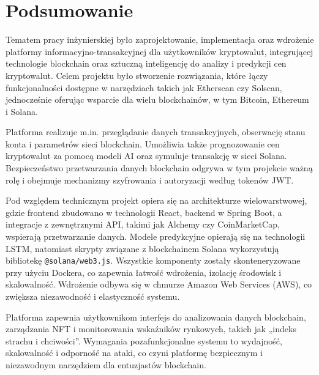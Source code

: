 \chapter{Podsumowanie}
Tematem pracy inżynierskiej było zaprojektowanie, implementacja oraz wdrożenie platformy informacyjno-transakcyjnej dla użytkowników kryptowalut, integrującej technologie blockchain oraz sztuczną inteligencję do analizy i predykcji cen kryptowalut. Celem projektu było stworzenie rozwiązania, które łączy funkcjonalności dostępne w narzędziach takich jak Etherscan czy Solscan, jednocześnie oferując wsparcie dla wielu blockchainów, w tym Bitcoin, Ethereum i Solana.

Platforma realizuje m.in. przeglądanie danych transakcyjnych, obserwację stanu konta i parametrów sieci blockchain. Umożliwia także prognozowanie cen kryptowalut za pomocą modeli AI oraz symuluje transakcję w sieci Solana. Bezpieczeństwo przetwarzania danych blockchain odgrywa w tym projekcie ważną rolę i obejmuje mechanizmy szyfrowania i autoryzacji według tokenów JWT.

Pod względem technicznym projekt opiera się na architekturze wielowarstwowej, gdzie frontend zbudowano w technologii React, backend w Spring Boot, a integracje z zewnętrznymi API, takimi jak Alchemy czy CoinMarketCap, wspierają przetwarzanie danych. Modele predykcyjne opierają się na technologii LSTM, natomiast skrypty związane z blockchainem Solana wykorzystują bibliotekę \texttt{@solana/web3.js}. Wszystkie komponenty zostały skonteneryzowane przy użyciu Dockera, co zapewnia łatwość wdrożenia, izolację środowisk i skalowalność. Wdrożenie odbywa się w chmurze Amazon Web Services (AWS), co zwiększa niezawodność i elastyczność systemu.

Platforma zapewnia użytkownikom interfejs do analizowania danych blockchain, zarządzania NFT i monitorowania wskaźników rynkowych, takich jak „indeks strachu i chciwości”. Wymagania pozafunkcjonalne systemu to wydajność, skalowalność i odporność na ataki, co czyni platformę bezpiecznym i niezawodnym narzędziem dla entuzjastów blockchain.